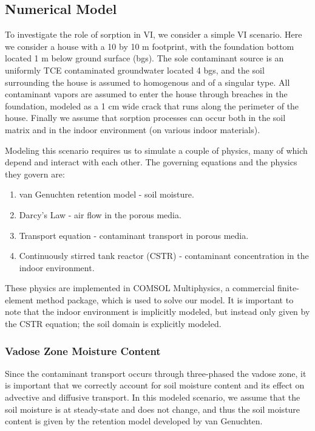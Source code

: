 \subsection{Numerical Model}\label{sec:model}

To investigate the role of sorption in VI, we consider a simple VI scenario.
Here we consider a house with a 10 by 10 m footprint, with the foundation bottom located 1 m below ground surface (bgs).
The sole contaminant source is an uniformly TCE contaminated groundwater located 4 bgs, and the soil surrounding the house is assumed to homogenous and of a singular type.
All contaminant vapors are assumed to enter the house through breaches in the foundation, modeled as a 1 cm wide crack that runs along the perimeter of the house.
Finally we assume that sorption processes can occur both in the soil matrix and in the indoor environment (on various indoor materials).\par

Modeling this scenario requires us to simulate a couple of physics, many of which depend and interact with each other.
The governing equations and the physics they govern are:
\begin{enumerate}
  \item van Genuchten retention model - soil moisture.
  \item Darcy's Law - air flow in the porous media.
  \item Transport equation - contaminant transport in porous media.
  \item Continuously stirred tank reactor (CSTR) - contaminant concentration in the indoor environment.
\end{enumerate}
These physics are implemented in COMSOL Multiphysics, a commercial finite-element method package, which is used to solve our model.
It is important to note that the indoor environment is implicitly modeled, but instead only given by the CSTR equation; the soil domain is explicitly modeled.\par

\subsubsection{Vadose Zone Moisture Content}

Since the contaminant transport occurs through three-phased the vadose zone, it is important that we correctly account for soil moisture content and its effect on advective and diffusive transport.
In this modeled scenario, we assume that the soil moisture is at steady-state and does not change, and thus the soil moisture content is given by the retention model developed by van Genuchten.\par

